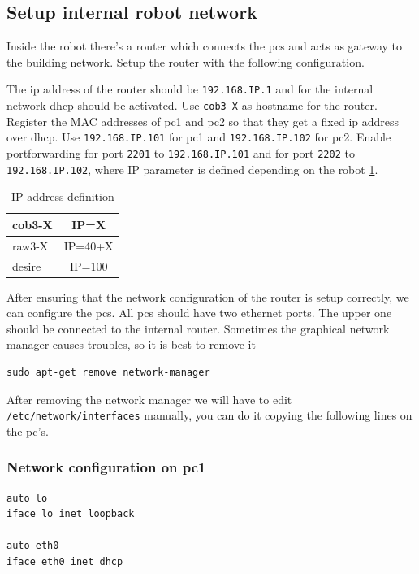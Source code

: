 \subsection{Setup internal robot network}\label{sec:network}
Inside the robot there's a router which connects the pcs and acts as gateway to the building network. Setup the router with the following configuration. 

The ip address of the router should be \texttt{192.168.IP.1} and for the internal network dhcp should be activated. Use \texttt{cob3-X} as hostname for the router. Register the MAC addresses of pc1 and pc2 so that they get a fixed ip address over dhcp. Use \texttt{192.168.IP.101} for pc1 and \texttt{192.168.IP.102} for pc2. Enable portforwarding for port \texttt{2201} to \texttt{192.168.IP.101} and for port \texttt{2202} to \texttt{192.168.IP.102}, where IP parameter is defined depending on the robot \ref{IP_table}.

\begin{table}[h]
\begin{center}
\begin{tabular}{ | l | c | }
  \hline
  cob3-X & IP=X \\
  \hline
  raw3-X & IP=40+X \\
  \hline
  desire & IP=100 \\
  \hline
\end{tabular}
\end{center}
\caption{IP address definition}
\label{IP_table}
\end{table}


After ensuring that the network configuration of the router is setup correctly, we can configure the pcs. All pcs should have two ethernet ports. The upper one should be connected to the internal router. Sometimes the graphical network manager causes troubles, so it is best to remove it
\begin{lstlisting}
sudo apt-get remove network-manager
\end{lstlisting}

After removing the network manager we will have to edit \texttt{/etc/network/interfaces} manually,  you can do it copying the following lines on the pc's.

\subsubsection{Network configuration on pc1}

\begin{lstlisting}
auto lo
iface lo inet loopback

auto eth0
iface eth0 inet dhcp
\end{lstlisting}


